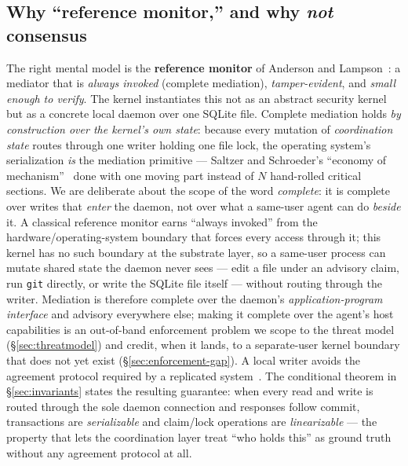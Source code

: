 \documentclass[11pt,a4paper]{article}
\theoremstyle{definition}
\theoremstyle{remark}
\begin{document}
\subsection{Why ``reference monitor,'' and why \emph{not} consensus}
The right mental model is the \textbf{reference monitor} of Anderson and
Lampson~: a mediator that is \emph{always invoked}
(complete mediation), \emph{tamper-evident}, and \emph{small enough to verify}.
The kernel instantiates this not as an abstract security kernel but as a concrete
local daemon over one SQLite file. Complete mediation holds \emph{by construction
over the kernel's own state}: because every mutation of \emph{coordination state}
routes through one writer holding one file lock, the operating system's
serialization \emph{is} the mediation primitive --- Saltzer and Schroeder's
``economy of mechanism''~ done with one moving part
instead of $N$ hand-rolled critical sections. We are deliberate about the scope of
the word \emph{complete}: it is complete over writes that \emph{enter} the daemon,
not over what a same-user agent can do \emph{beside} it. A classical reference
monitor earns ``always invoked'' from the hardware/operating-system boundary that
forces every access through it; this kernel has no such boundary at the substrate
layer, so a same-user process can mutate shared state the daemon never sees ---
edit a file under an advisory claim, run \texttt{git} directly, or write the
SQLite file itself --- without routing through the writer. Mediation is therefore
complete over the daemon's \emph{application-program interface} and advisory
everywhere else; making it complete over the agent's host capabilities is an
out-of-band enforcement problem we scope to the threat model
(\S\ref{sec:threatmodel}) and credit, when it lands, to a separate-user kernel
boundary that does not yet exist (\S\ref{sec:enforcement-gap}).
%
A local writer avoids the agreement protocol required by a replicated
system~. The conditional theorem in
\S\ref{sec:invariants} states the resulting guarantee: when every read and write is routed through the sole daemon
connection and responses follow commit, transactions are \emph{serializable} and
claim/lock operations are \emph{linearizable} --- the property that lets the coordination layer treat ``who
holds this'' as ground truth without any agreement protocol at all.
\end{document}
